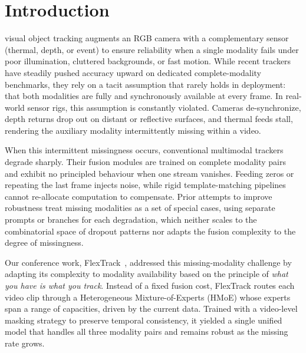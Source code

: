 
\section{Introduction}
\label{sec:intro}

 visual object tracking augments an RGB camera with a complementary sensor (thermal, depth, or event) to ensure reliability when a single modality fails under poor illumination, cluttered backgrounds, or fast motion. While recent trackers have steadily pushed accuracy upward on dedicated complete-modality benchmarks, they rely on a tacit assumption that rarely holds in deployment: that both modalities are fully and synchronously available at every frame. In real-world sensor rigs, this assumption is constantly violated. Cameras de-synchronize, depth returns drop out on distant or reflective surfaces, and thermal feeds stall, rendering the auxiliary modality intermittently missing within a video.

When this intermittent missingness occurs, conventional multimodal trackers degrade sharply. Their fusion modules are trained on complete modality pairs and exhibit no principled behaviour when one stream vanishes. Feeding zeros or repeating the last frame injects noise, while rigid template-matching pipelines cannot re-allocate computation to compensate. Prior attempts to improve robustness treat missing modalities as a set of special cases, using separate prompts or branches for each degradation, which neither scales to the combinatorial space of dropout patterns nor adapts the fusion complexity to the degree of missingness.

Our conference work, FlexTrack~\cite{tan2025flextrack}, addressed this missing-modality challenge by adapting its complexity to modality availability based on the principle of \emph{what you have is what you track}. Instead of a fixed fusion cost, FlexTrack routes each video clip through a Heterogeneous Mixture-of-Experts (HMoE) whose experts span a range of capacities, driven by the current data. Trained with a video-level masking strategy to preserve temporal consistency, it yielded a single unified model that handles all three modality pairs and remains robust as the missing rate grows.

